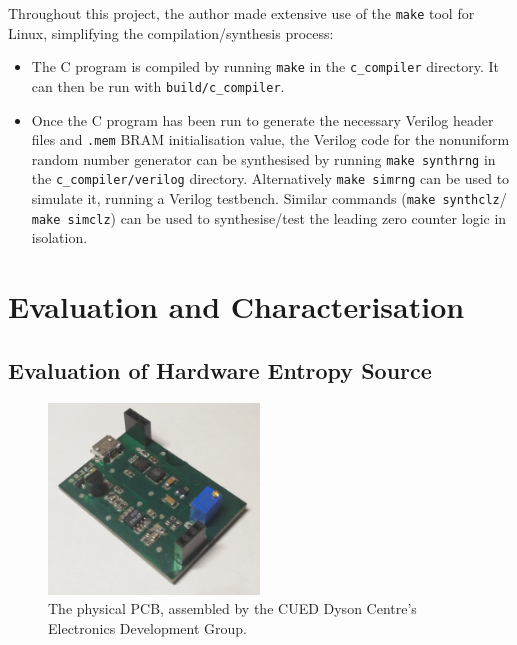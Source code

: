 \documentclass[12pt]{article}
\begin{document}
    Throughout this project, the author made extensive use of the \texttt{make} tool for Linux, simplifying the compilation/synthesis process:
    \begin{itemize}
      \item The C program is compiled by running \texttt{make} in the \texttt{c\_compiler} directory. It can then be run with \texttt{build/c\_compiler}.
      \item Once the C program has been run to generate the necessary Verilog header files and \texttt{.mem} BRAM initialisation value, the Verilog code for the nonuniform random number generator can be synthesised by running \texttt{make synthrng} in the \texttt{c\_compiler/verilog} directory. Alternatively \texttt{make simrng} can be used to simulate it, running a  Verilog testbench. Similar commands (\texttt{make synthclz}/ \texttt{make simclz}) can be used to synthesise/test the leading zero counter logic in isolation.
    \end{itemize}

\newpage



%
%

\section{Evaluation and Characterisation} \label{section:characterisation}

  \subsection{Evaluation of Hardware Entropy Source} \label{subsection:eval_hardware_entropy}
    \begin{figure}[H]
      \centering
      \includegraphics[width=0.5\textwidth]{fig/PCB_CROPPED.jpg}
      \caption{The physical PCB, assembled by the CUED Dyson Centre's Electronics Development Group.}
      \label{fig:pcb_cropped}
    \end{figure}
\end{document}
